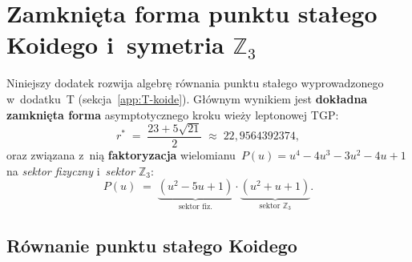 \section{Zamkni\k{e}ta forma punktu sta\l{}ego Koidego i~symetria
  $\mathbb{Z}_3$}%
\label{app:T2-fp-algebra}

Niniejszy dodatek rozwija algebr\k{e} r\'ownania punktu sta\l{}ego
wyprowadzonego w~dodatku~T (sekcja~\ref{app:T-koide}).
G\l{}\'ownym wynikiem jest \textbf{dok\l{}adna zamkni\k{e}ta forma}
asymptotycznego kroku wie\.zy leptonowej TGP:
\begin{equation}\label{eq:T2-rstar-exact}
  \boxed{r^* \;=\; \frac{23 + 5\sqrt{21}}{2} \;\approx\; 22{,}9564392374,}
\end{equation}
oraz zwi\k{a}zana z~ni\k{a} \textbf{faktoryzacja}
wielomianu~$P(u) = u^4-4u^3-3u^2-4u+1$ na \emph{sektor fizyczny}
i~\emph{sektor $\mathbb{Z}_3$}:
\begin{equation}\label{eq:T2-factor}
  \boxed{P(u) \;=\; \underbrace{(u^2-5u+1)}_{\text{sektor fiz.}}
                \cdot \underbrace{(u^2+u+1)}_{\text{sektor }\mathbb{Z}_3}.}
\end{equation}

\medskip
\noindent{}
\medskip


\subsection{R\'ownanie punktu sta\l{}ego Koidego}\label{app:T2-fpeq}

